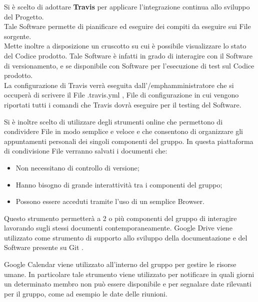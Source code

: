 
Si è scelto di adottare \textbf{Travis} per applicare l’integrazione continua allo sviluppo del Progetto.\\ 
Tale Software permette di pianificare ed eseguire dei compiti da eseguire sui File sorgente.\\
Mette inoltre a disposizione un cruscotto su cui è possibile visualizzare lo stato del Codice prodotto. Tale Software è infatti in grado di interagire con il Software di versionamento, e se disponibile con Software per l’esecuzione di test sul Codice prodotto.\\ 
La configurazione di Travis verrà eseguita dall'/emph{amministratore} che si occuperà di scrivere il File .travis.yml , File di configurazione in cui vengono riportati tutti i comandi che Travis dovrà eseguire per il testing del Software.

  \label{sec:condivisioneFile}
  Si è inoltre scelto di utilizzare degli strumenti online che permettono di condividere File
  in modo semplice e veloce e che consentono di organizzare gli appuntamenti personali
  dei singoli componenti del gruppo.
  In questa piattaforma di condivisione File verranno salvati i documenti che:
  \begin{itemize}
  
  
  \item Non necessitano di controllo di versione;
  \item Hanno bisogno di grande interattività tra i componenti del gruppo;
  \item Possono essere acceduti tramite l’uso di un semplice Browser.
   \end{itemize}
  Questo strumento permetterà a 2 o più componenti del gruppo di interagire lavorando sugli stessi documenti contemporaneamente. Google Drive viene utilizzato come strumento di supporto allo sviluppo della documentazione e del Software presente su Git .
  


 
Google Calendar viene utilizzato all’interno del gruppo per gestire le risorse umane. In
particolare tale strumento viene utilizzato per notificare in quali giorni un determinato
membro non può essere disponibile e per segnalare date rilevanti per il gruppo, come
ad esempio le date delle riunioni.
